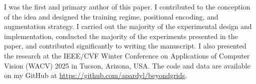 I was the first and primary author of this paper. I contributed to the conception of the idea and designed the training regime, positional encoding, and augmentation strategy. I carried out the majority of the experimental design and implementation, conducted the majority of the experiments presented in the paper, and contributed significantly to writing the manuscript. I also presented the research at the IEEE/CVF Winter Conference on Applications of Computer Vision (WACV) 2025 in Tucson, Arizona, USA. The code and data are available on my GitHub at \url{https://github.com/apardyl/beyondgrids}.
